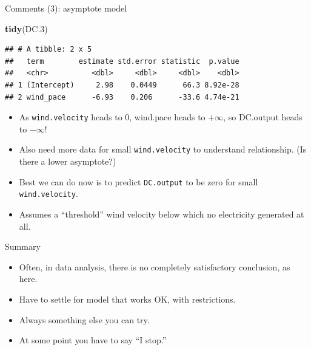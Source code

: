 \documentclass[
  ignorenonframetext,
]{beamer}
\newenvironment{Shaded}{\begin{snugshade}}{\end{snugshade}}
\newcommand{\FloatTok}[1]{\textcolor[rgb]{0.00,0.00,0.81}{#1}}
\newcommand{\KeywordTok}[1]{\textcolor[rgb]{0.13,0.29,0.53}{\textbf{#1}}}
\newcommand{\NormalTok}[1]{#1}
\providecommand{\tightlist}{%
  \setlength{\itemsep}{0pt}\setlength{\parskip}{0pt}}
\begin{document}
\begin{frame}[fragile]{Comments (3): asymptote model}
\protect\hypertarget{comments-3-asymptote-model}{}

\small

\begin{Shaded}
\begin{Highlighting}[]
\KeywordTok{tidy}\NormalTok{(DC}\FloatTok{.3}\NormalTok{)}
\end{Highlighting}
\end{Shaded}

\begin{verbatim}
## # A tibble: 2 x 5
##   term        estimate std.error statistic  p.value
##   <chr>          <dbl>     <dbl>     <dbl>    <dbl>
## 1 (Intercept)     2.98    0.0449      66.3 8.92e-28
## 2 wind_pace      -6.93    0.206      -33.6 4.74e-21
\end{verbatim}

\normalsize

\begin{itemize}
\tightlist
\item
  As \texttt{wind.velocity} heads to 0, wind.pace heads to \(+\infty\),
  so DC.output heads to \(−\infty\)!
\item
  Also need more data for small \texttt{wind.velocity} to understand
  relationship. (Is there a lower asymptote?)
\item
  Best we can do now is to predict \texttt{DC.output} to be zero for
  small \texttt{wind.velocity}.
\item
  Assumes a ``threshold'' wind velocity below which no electricity
  generated at all.
\end{itemize}

\end{frame}

\begin{frame}{Summary}
\protect\hypertarget{summary}{}

\begin{itemize}
\tightlist
\item
  Often, in data analysis, there is no completely satisfactory
  conclusion, as here.
\item
  Have to settle for model that works OK, with restrictions.
\item
  Always something else you can try.
\item
  At some point you have to say ``I stop.''
\end{itemize}

\end{frame}
\end{document}
